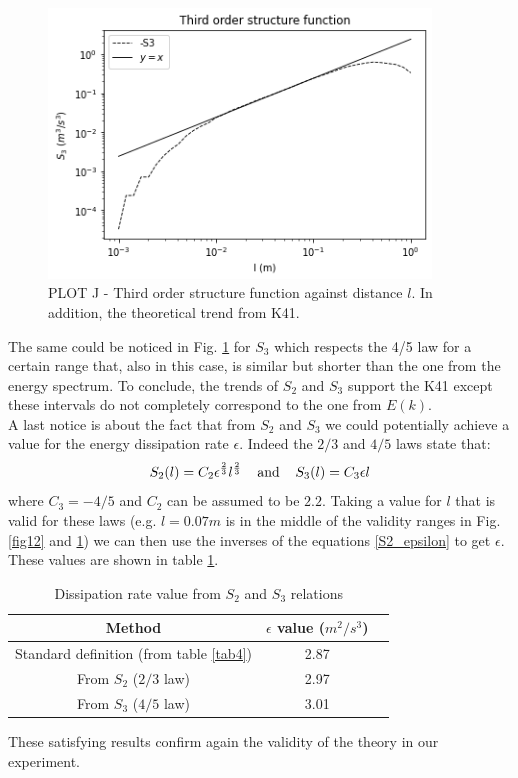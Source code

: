 \documentclass[11pt,titlepage]{article}
\begin{document}
\begin{center}
	\begin{figure} [h]
		\centering
		\includegraphics[width = 4in]{./figures/ex1_7_2.png}
		\caption{PLOT J - Third order structure function against distance $l$. In addition, the theoretical trend from K41.}
		\label{fig13}
	\end{figure}
\end{center}
The same could be noticed in Fig. \ref{fig13} for $S_3$ which respects the 4/5 law for a certain range that, also in this case, is similar but shorter than the one from the energy spectrum. To conclude, the trends of $S_2$ and $S_3$ support the K41 except these intervals do not completely correspond to the one from $E(k)$. \\
A last notice is about the fact that from $S_2$ and $S_3$ we could potentially achieve a value for the energy dissipation rate $\epsilon$. Indeed the $2/3$ and $4/5$ laws state that:
\begin{equation} \label{S2_epsilon}
	S_2(l) = C_2 \epsilon^\frac{2}{3} l^\frac{2}{3} \hspace{4mm} \text{and} \hspace{4mm}S_3(l) = C_3 \epsilon l
\end{equation}
where $C_3 = -4/5$ and $C_2$ can be assumed to be $2.2$. Taking a value for $l$ that is valid for these laws (e.g. $l=0.07m$ is in the middle of the validity ranges in Fig. \ref{fig12} and \ref{fig13}) we can then use the inverses of the equations \ref{S2_epsilon} to get $\epsilon$. These values are shown in table \ref{tab6}.

\begin{table}[h]
	\centering
	\caption{Dissipation rate value from $S_2$ and $S_3$ relations} \label{tab6}
	\begin{tabular}{ | c | c | c |}
		\hline
		Method &  $\epsilon$ value ($m^2/s^3$) \\
		\hline
		Standard definition (from table \ref{tab4}) & 2.87 \\
		\hline
		From $S_2$ ($2/3$ law) & 2.97\\
		\hline
		From $S_3$ ($4/5$ law) & 3.01\\
		\hline
	\end{tabular}
\end{table}
These satisfying results confirm again the validity of the theory in our experiment.
\end{document}
